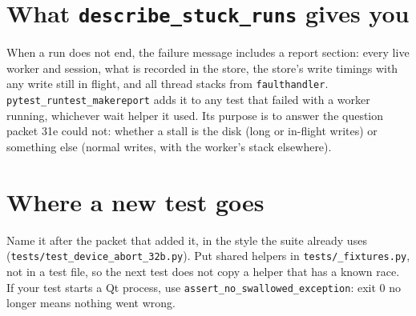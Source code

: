 \section{What \texttt{describe\_\allowbreak{}stuck\_\allowbreak{}runs} gives you}

When a run does not end, the failure message includes a report section: every live worker and session,
what is recorded in the store, the store's write timings with any write still in flight, and all thread
stacks from \texttt{faulthandler}. \texttt{pytest\_\allowbreak{}runtest\_\allowbreak{}makereport} adds it to any test that failed
with a worker running, whichever wait helper it used. Its purpose is to answer the question packet 31e
could not: whether a stall is the disk (long or in-flight writes) or something else (normal writes, with
the worker's stack elsewhere).

\section{Where a new test goes}

Name it after the packet that added it, in the style the suite already uses
(\texttt{tests/\allowbreak{}test\_\allowbreak{}device\_\allowbreak{}abort\_\allowbreak32b.py}). Put shared helpers in \texttt{tests/\_fixtures.py}, not in a
test file, so the next test does not copy a helper that has a known race. If your test starts a Qt process,
use \texttt{assert\_\allowbreak{}no\_\allowbreak{}swallowed\_\allowbreak{}exception}: exit 0 no longer means nothing went wrong.

